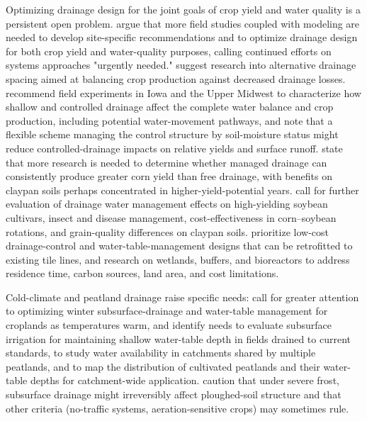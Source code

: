 \documentclass[11pt]{article}
\begin{document}
Optimizing drainage design for the joint goals of crop yield and water quality is a persistent open problem. \textcite{Kladivko2021} argue that more field studies coupled with modeling are needed to develop site-specific recommendations and to optimize drainage design for both crop yield and water-quality purposes, calling continued efforts on systems approaches "urgently needed." \textcite{Zhao2016} suggest research into alternative drainage spacing aimed at balancing crop production against decreased drainage losses. \textcite{Singh2006b,Singh2007b} recommend field experiments in Iowa and the Upper Midwest to characterize how shallow and controlled drainage affect the complete water balance and crop production, including potential water-movement pathways, and note that a flexible scheme managing the control structure by soil-moisture status might reduce controlled-drainage impacts on relative yields and surface runoff. \textcite{Nash2015} state that more research is needed to determine whether managed drainage can consistently produce greater corn yield than free drainage, with benefits on claypan soils perhaps concentrated in higher-yield-potential years. \textcite{Nelson2011} call for further evaluation of drainage water management effects on high-yielding soybean cultivars, insect and disease management, cost-effectiveness in corn--soybean rotations, and grain-quality differences on claypan soils. \textcite{Dinnes2002} prioritize low-cost drainage-control and water-table-management designs that can be retrofitted to existing tile lines, and research on wetlands, buffers, and bioreactors to address residence time, carbon sources, land area, and cost limitations.

Cold-climate and peatland drainage raise specific needs: \textcite{Li2025} call for greater attention to optimizing winter subsurface-drainage and water-table management for croplands as temperatures warm, and \textcite{Läpikivi2025} identify needs to evaluate subsurface irrigation for maintaining shallow water-table depth in fields drained to current standards, to study water availability in catchments shared by multiple peatlands, and to map the distribution of cultivated peatlands and their water-table depths for catchment-wide application. \textcite{STEINHARDT1974} caution that under severe frost, subsurface drainage might irreversibly affect ploughed-soil structure and that other criteria (no-traffic systems, aeration-sensitive crops) may sometimes rule.
\end{document}
